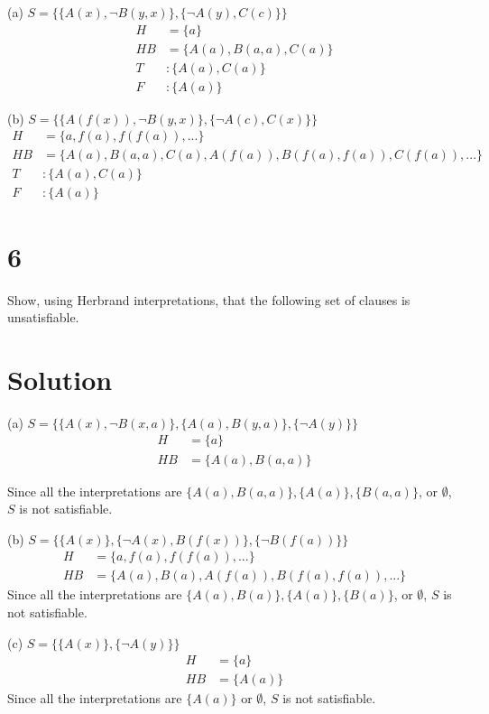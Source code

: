 \documentclass[10pt]{article}
\begin{document}
\begin{description*}
\item[(a)] $S = \{ \{ A(x), \lnot B(y,x) \}, \{ \lnot A(y), C(c) \} \}$
\begin{align*}
H &= \{ a \} \\
HB &= \{ A(a), B(a,a), C(a) \} \\
T&: \{ A(a), C(a) \} \\
F&: \{ A(a) \}
\end{align*}
\item[(b)] $S = \{ \{ A(f(x)), \lnot B(y,x)\}, \{ \lnot A(c),C(x) \} \}$
\begin{align*}
H &= \{ a, f(a), f(f(a)), ... \} \\
HB &= \{ A(a), B(a,a), C(a), A(f(a)), B(f(a), f(a)), C(f(a)), ... \} \\
T&: \{ A(a), C(a) \} \\
F&: \{ A(a) \}
\end{align*}
\end{description*}



\section*{6}
Show, using Herbrand interpretations, that the following set of clauses is unsatisfiable.

\section*{Solution} 
\begin{description*}
\item[(a)] $S = \{ \{ A(x), \lnot B(x,a) \}, \{ A(a), B(y,a) \}, \{ \lnot A(y) \} \}$
\begin{align*}
H &= \{ a \} \\
HB &= \{ A(a), B(a,a) \}
\end{align*}

Since all the interpretations are $\{ A(a), B(a,a) \}, \{ A(a) \}, \{ B(a,a) \}$, or $\emptyset$, $S$ is not satisfiable. \\

\item[(b)] $S = \{ \{ A(x)\}, \{ \lnot A(x), B(f(x)) \}, \{ \lnot B(f(a)) \} \}$
\begin{align*}
H &= \{ a, f(a), f(f(a)), ... \} \\
HB &= \{ A(a), B(a), A(f(a)), B(f(a), f(a)), ... \}
\end{align*}
Since all the interpretations are $\{ A(a), B(a) \}, \{ A(a) \}, \{ B(a) \}$, or $\emptyset$, $S$ is not satisfiable. \\

\item[(c)] $S = \{ \{ A(x) \}, \{ \lnot A(y) \} \}$
\begin{align*}
H &= \{ a \} \\
HB &= \{ A(a) \}
\end{align*}
Since all the interpretations are $\{ A(a) \}$ or $\emptyset$, $S$ is not satisfiable. 
\end{description*}
\end{document}
